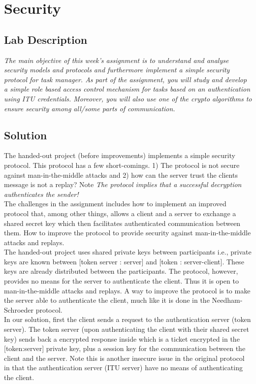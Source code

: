 \chapter{Security}
\minitoc

\section{Lab Description}
\textit{The main objective of this week's assignment is to understand and analyse security models and protocols and furthermore implement a simple security protocol for task manager. As part of the assignment, you will study and develop a simple role based access control mechanism for tasks based on an authentication using ITU credentials. Moreover, you will also use one of the crypto algorithms to ensure security among all/some parts of communication.}

\section{Solution}

The handed-out project (before improvements) implements a simple security protocol. This protocol has a few short-comings. 1) The protocol is not secure against man-in-the-middle attacks and 2) how can the server trust the clients message is not a replay? Note \textit{The protocol implies that a successful decryption authenticates the sender!} \\

The challenges in the assignment includes how to implement an improved protocol that, among other things, allows a client and a server to exchange a shared secret key which then facilitates authenticated communication between them. How to improve the protocol to provide security against man-in-the-middle attacks and replays.  \\

The handed-out project uses shared private keys between participants i.e., private keys are known between [token server : server] and [token : server-client]. These keys are already distributed between the participants. The protocol, however, provides no means for the server to authenticate the client. Thus it is open to man-in-the-middle attacks and replays. A way to improve the protocol is to make the server able to authenticate the client, much like it is done in the Needham-Schroeder protocol.\\


In our solution, first the client sends a request to the authentication server (token server). The token server (upon authenticating the client with their shared secret key) sends back a encrypted response inside which is a ticket encrypted in the [token:server] private key, plus a session key for the communication between the client and the server. Note this is another insecure issue in the original protocol in that the authentication server (ITU server) have no means of authenticating the client. \\


